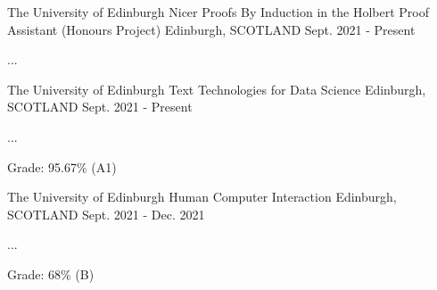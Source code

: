 

\begin{cventries}
  \cventry
    {The University of Edinburgh} %
    {Nicer Proofs By Induction in the Holbert Proof Assistant (Honours Project)} %
    {Edinburgh, SCOTLAND} %
    {Sept. 2021 - Present} %
    {
      \color{awesome} \color{graytext}
      \vspace{1.8em}
      \begin{cvitems} %
        \item ...
      \end{cvitems}
    }
    \vspace{.08cm}
    
  \cventry
    {The University of Edinburgh} %
    {Text Technologies for Data Science} %
    {Edinburgh, SCOTLAND} %
    {Sept. 2021 - Present} %
    {
      \color{awesome}  \color{graytext}
      \vspace{1.8em}
      \begin{cvitems} %
        \item ...
        \item Grade: 95.67\% (A1)
      \end{cvitems}
    }
    \vspace{.08cm}

  \cventry
    {The University of Edinburgh} %
    {Human Computer Interaction} %
    {Edinburgh, SCOTLAND} %
    {Sept. 2021 - Dec. 2021} %
    {
      \color{awesome}\color{graytext}
      \vspace{1.8em}
      \begin{cvitems} %
        \item ...
        \item Grade: 68\% (B)
      \end{cvitems}
    }
    \vspace{.08cm}


\end{cventries}
